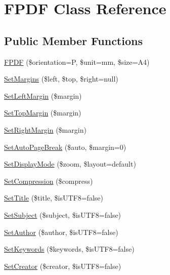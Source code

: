 \hypertarget{class_f_p_d_f}{}\section{F\+P\+D\+F Class Reference}
\label{class_f_p_d_f}
\subsection*{Public Member Functions}
\begin{DoxyCompactItemize}
\item 
\hyperlink{class_f_p_d_f_ae8c90f72b7efb5bc6d9bafda0689ea36}{F\+P\+D\+F} (\$orientation=\textquotesingle{}P\textquotesingle{}, \$unit=\textquotesingle{}mm\textquotesingle{}, \$size=\textquotesingle{}A4\textquotesingle{})
\item 
\hyperlink{class_f_p_d_f_ad56bcdc517c73590acc9b46ea07df54d}{Set\+Margins} (\$left, \$top, \$right=null)
\item 
\hyperlink{class_f_p_d_f_a4a873f55447a71303ce1958c59a98789}{Set\+Left\+Margin} (\$margin)
\item 
\hyperlink{class_f_p_d_f_a22dda679718f538c49e955e555ab0a9a}{Set\+Top\+Margin} (\$margin)
\item 
\hyperlink{class_f_p_d_f_a7f452e4166f36a72906775a40c15e407}{Set\+Right\+Margin} (\$margin)
\item 
\hyperlink{class_f_p_d_f_a0b1468e198e5b9c70849884a76d178e2}{Set\+Auto\+Page\+Break} (\$auto, \$margin=0)
\item 
\hyperlink{class_f_p_d_f_adf35460d37337a0230bb08629c120d79}{Set\+Display\+Mode} (\$zoom, \$layout=\textquotesingle{}default\textquotesingle{})
\item 
\hyperlink{class_f_p_d_f_ae16f74f4f495c81b144b73d468b34b14}{Set\+Compression} (\$compress)
\item 
\hyperlink{class_f_p_d_f_a80e45ebc65d0f0f5d7561cd9d4e07d2a}{Set\+Title} (\$title, \$is\+U\+T\+F8=false)
\item 
\hyperlink{class_f_p_d_f_a46113100b89d952a09025804d0ccfcd4}{Set\+Subject} (\$subject, \$is\+U\+T\+F8=false)
\item 
\hyperlink{class_f_p_d_f_a905fdb373900fd1b96d6e1cd6c26a764}{Set\+Author} (\$author, \$is\+U\+T\+F8=false)
\item 
\hyperlink{class_f_p_d_f_a7e4661e4268a8fb243eacb1ee63fd940}{Set\+Keywords} (\$keywords, \$is\+U\+T\+F8=false)
\item 
\hyperlink{class_f_p_d_f_a7f0b25d1e942566c5243f3b87a2e3c49}{Set\+Creator} (\$creator, \$is\+U\+T\+F8=false)

\end{DoxyCompactItemize}
